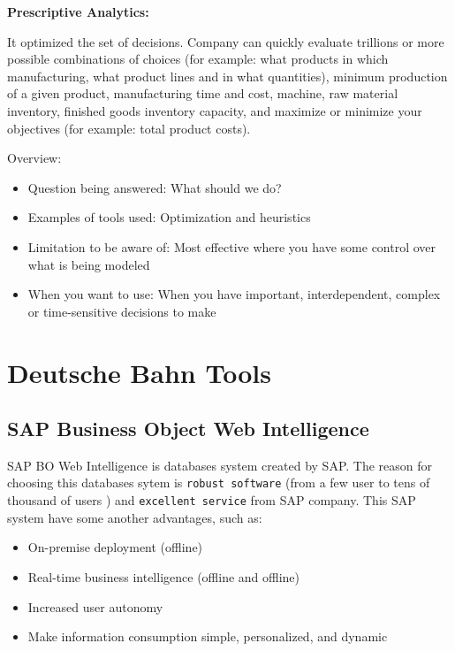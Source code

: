 \documentclass[]{book}
\providecommand{\tightlist}{%
  \setlength{\itemsep}{0pt}\setlength{\parskip}{0pt}}
\begin{document}
\textbf{Prescriptive Analytics: }

It optimized the set of decisions. Company can quickly evaluate
trillions or more possible combinations of choices (for example: what
products in which manufacturing, what product lines and in what
quantities), minimum production of a given product, manufacturing time
and cost, machine, raw material inventory, finished goods inventory
capacity, and maximize or minimize your objectives (for example: total
product costs).

Overview:

\begin{itemize}
\tightlist
\item
  Question being answered: What should we do?
\item
  Examples of tools used: Optimization and heuristics
\item
  Limitation to be aware of: Most effective where you have some control
  over what is being modeled
\item
  When you want to use: When you have important, interdependent, complex
  or time-sensitive decisions to make
\end{itemize}

\section{Deutsche Bahn Tools}\label{deutsche-bahn-tools}

\subsection{SAP Business Object Web
Intelligence}\label{sap-business-object-web-intelligence}

SAP BO Web Intelligence is databases system created by SAP. The reason
for choosing this databases sytem is \texttt{robust\ software} (from a
few user to tens of thousand of users ) and \texttt{excellent\ service}
from SAP company. This SAP system have some another advantages, such as:

\begin{itemize}
\tightlist
\item
  On-premise deployment (offline)
\item
  Real-time business intelligence (offline and offline)
\item
  Increased user autonomy
\item
  Make information consumption simple, personalized, and dynamic
\end{itemize}
\end{document}
